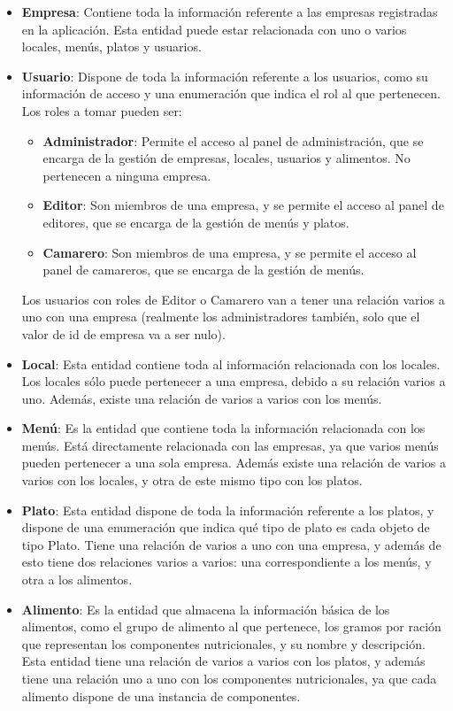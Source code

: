 \begin{itemize}
	\item \textbf{Empresa}: Contiene toda la información referente a las empresas registradas en la aplicación. Esta entidad puede estar relacionada con uno o varios locales, menús, platos y usuarios.
	\item \textbf{Usuario}: Dispone de toda la información referente a los usuarios, como su información de acceso y una enumeración que indica el rol al que pertenecen. Los roles a tomar pueden ser:
	\begin{itemize}
		\item \textbf{Administrador}: Permite el acceso al panel de administración, que se encarga de la gestión de empresas, locales, usuarios y alimentos. No pertenecen a ninguna empresa.
		\item \textbf{Editor}: Son miembros de una empresa, y se permite el acceso al panel de editores, que se encarga de la gestión de menús y platos.
		\item \textbf{Camarero}: Son miembros de una empresa, y se permite el acceso al panel de camareros, que se encarga de la gestión de menús.
	\end{itemize}
	Los usuarios con roles de Editor o Camarero van a tener una relación varios a uno con una empresa (realmente los administradores también, solo que el valor de id de empresa va a ser nulo).
	\item \textbf{Local}: Esta entidad contiene toda al información relacionada con los locales. Los locales sólo puede pertenecer a una empresa, debido a su relación varios a uno. Además, existe una relación de varios a varios con los menús.
	\item \textbf{Menú}: Es la entidad que contiene toda la información relacionada con los menús. Está directamente relacionada con las empresas, ya que varios menús pueden pertenecer a una sola empresa. Además existe una relación de varios a varios con los locales, y otra de este mismo tipo con los platos.
	\item \textbf{Plato}: Esta entidad dispone de toda la información referente a los platos, y dispone de una enumeración que indica qué tipo de plato es cada objeto de tipo Plato. Tiene una relación de varios a uno con una empresa, y además de esto tiene dos relaciones varios a varios: una correspondiente a los menús, y otra a los alimentos.
	\item \textbf{Alimento}: Es la entidad que almacena la información básica de los alimentos, como el grupo de alimento al que pertenece, los gramos por ración que representan los componentes nutricionales, y su nombre y descripción. Esta entidad tiene una relación de varios a varios con los platos, y además tiene una relación uno a uno con los componentes nutricionales, ya que cada alimento dispone de una instancia de componentes.

\end{itemize}
